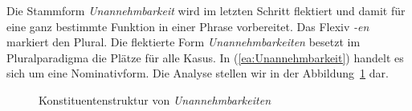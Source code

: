 Die Stammform \textit{Unannehmbarkeit} wird im letzten Schritt flektiert und damit für eine ganz bestimmte Funktion in einer Phrase vorbereitet. Das Flexiv \textit{-en} markiert den Plural. Die flektierte Form \textit{Unannehmbarkeiten} besetzt im Pluralparadigma die Plätze für alle Kasus. In (\ref{ea:Unannehmbarkeit}) handelt es sich um eine Nominativform.   
Die Analyse stellen wir in der Abbildung~\ref{caption:Unannehmbarkeit} dar.

\begin{figure}

	\caption{Konstituentenstruktur von \textit{Unannehmbarkeiten} }\label{caption:Unannehmbarkeit}
\end{figure}


